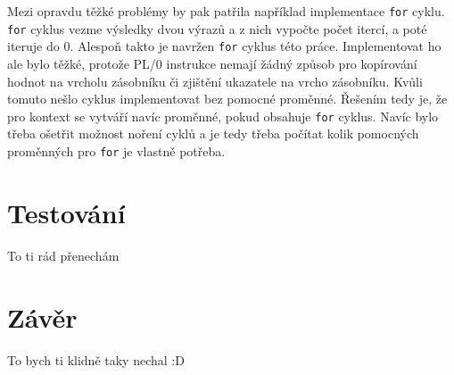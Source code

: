 \documentclass[12pt, letterpaper]{article}
\begin{document}
Mezi opravdu těžké problémy by pak patřila například implementace \texttt{for} cyklu. \texttt{for} cyklus vezme 
výsledky dvou výrazů a z nich vypočte počet itercí, a poté iteruje do 0. Alespoň takto je navržen \texttt{for} cyklus
této práce. Implementovat ho ale bylo těžké, protože PL/0 instrukce nemají žádný způsob pro kopírování hodnot na 
vrcholu zásobníku či zjištění ukazatele na vrcho zásobníku. Kvůli tomuto nešlo cyklus implementovat bez pomocné 
proměnné. Řešením tedy je, že pro kontext se vytváří navíc proměnné, pokud obsahuje \texttt{for} cyklus. Navíc bylo
třeba ošetřit možnost noření cyklů a je tedy třeba počítat kolik pomocných proměnných pro \texttt{for} je 
vlastně potřeba.
%
\section{Testování}
To ti rád přenechám
%
\section{Závěr}
To bych ti klidně taky nechal :D
\end{document}
